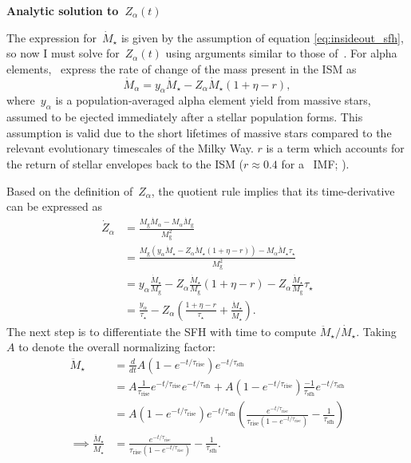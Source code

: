 \documentclass[12pt]{article}
\newcommand{\timescale}[1]{\ensuremath{\tau_\text{#1}}}
\begin{document}
\par\null\par\noindent
\textbf{Analytic solution to~$Z_\alpha(t)$}
\par\noindent
The expression for~$\dot{M}_\star$ is given by the assumption of equation
\ref{eq:insideout_sfh}, so now I must solve for~$Z_\alpha(t)$ using arguments
similar to those of~\citet*{Weinberg2017}.
For alpha elements,~\citet*{Weinberg2017} express the rate of change of the
mass present in the ISM as
\begin{equation}
\dot{M}_\alpha = y_\alpha \dot{M}_\star - Z_\alpha \dot{M}_\star (1 + \eta - r),
\label{eq:mdot_alpha}
\end{equation}
where~$y_\alpha$ is a population-averaged alpha element yield from massive
stars, assumed to be ejected immediately after a stellar population forms.
This assumption is valid due to the short lifetimes of massive stars compared
to the relevant evolutionary timescales of the Milky Way.
$r$ is a term which accounts for the return of stellar envelopes back to
the ISM ($r \approx 0.4$ for a~\citealt{Kroupa2001} IMF;
\citealp*{Weinberg2017}).
\par
Based on the definition of~$Z_\alpha$, the quotient rule implies that its
time-derivative can be expressed as
\begin{subequations}\begin{align}
\dot{Z}_\alpha &= \frac{
	M_\text{g} \dot{M}_\alpha - M_\alpha \dot{M}_\text{g}
}{
	M_\text{g}^2
}
\\
&= \frac{
	M_\text{g} (y_\alpha \dot{M}_\star - Z_\alpha \dot{M}_\star (1 + \eta - r))
	- M_\alpha \ddot{M}_\star \tau_\star
}{
	M_\text{g}^2
}
\\
&= y_\alpha \frac{\dot{M}_\star}{M_\text{g}} -
Z_\alpha \frac{\dot{M}_\star}{M_\text{g}}(1 + \eta - r) -
Z_\alpha \frac{\ddot{M}_\star}{M_\text{g}} \tau_\star
\\
&= \frac{y_\alpha}{\tau_\star} -
Z_\alpha \left(\frac{1 + \eta - r}{\tau_\star} +
\frac{\ddot{M}_\star}{\dot{M}_\star}\right).
\label{eq:dzdt}
\end{align}\end{subequations}
The next step is to differentiate the SFH with time to compute
$\ddot{M}_\star / \dot{M}_\star$. Taking~$A$ to denote the overall normalizing
factor:
\begin{subequations}\begin{align}
\ddot{M}_\star &= \frac{d}{dt}
A(1 - e^{-t / \timescale{rise}}) e^{-t / \timescale{sfh}}
\\
&= A \frac{1}{\timescale{rise}}e^{-t / \timescale{rise}}
e^{-t / \timescale{sfh}} +
A(1 - e^{-t / \timescale{rise}}) \frac{-1}{\timescale{sfh}}
e^{-t / \timescale{sfh}}
\\
&= A(1 - e^{-t / \timescale{rise}})e^{-t / \timescale{sfh}}
\left(\frac{
	e^{-t / \timescale{rise}}
}{
	\timescale{rise}(1 - e^{-t / \timescale{rise}})
} - \frac{1}{\timescale{sfh}}
\right)
\\
\implies \frac{\ddot{M}_\star}{\dot{M}_\star} &= \frac{
	e^{-t / \timescale{rise}}
}{
	\timescale{rise}(1 - e^{-t / \timescale{rise}})
} - \frac{1}{\timescale{sfh}}.
\label{eq:mddotstar-over-mdotstar}
\end{align}\end{subequations}
\end{document}
